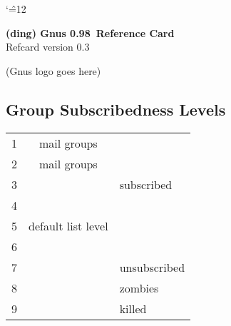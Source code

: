 \def\author{Vladimir Alexiev $<$vladimir@cs.ualberta.ca$>$}
\def\progver{0.98}\def\refver{0.3} %
\def\date{1 August 1995}
\textwidth 7.5in \textheight 10in \topmargin -1.0in
\oddsidemargin -0.5in \evensidemargin -0.5in

\twocolumn\scriptsize\pagestyle{empty}
\raggedbottom\raggedright
\newlength{\mywidth}
\newenvironment{keys}[1] %
  {\nopagebreak
   \settowidth{\mywidth}{#1}
   \addtolength{\mywidth}{\tabcolsep}
   \addtolength{\mywidth}{-\columnwidth}
   \begin{tabular}{@{}l@{\hspace{\tabcolsep}}p{-\mywidth}@{}}}
  {\end{tabular}\\}
\catcode`\^=12 %

\begin{center}
{\bf\LARGE (ding) Gnus \progver\ Reference Card\\}
{\normalsize Refcard version \refver}
\end{center}

\vspace{1in}
\centerline{(Gnus logo goes here)}
\vspace{1in}
\vfill

\subsection*{Group Subscribedness Levels}
\begin{tabular}{|r|c|l|}
\hline
1 & mail groups   &              \\
2 & mail groups   &              \\
3 &               & subscribed   \\
4 &               &              \\
5 & default list level &         \\
\hline
6 &               &              \\
7 &               & unsubscribed \\
\hline
8 &               & zombies      \\
\hline
9 &               & killed       \\
\hline
\end{tabular}

